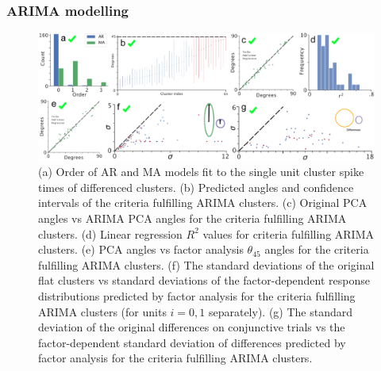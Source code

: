 \documentclass{article}
\begin{document}







\subsubsection*{ARIMA modelling}


\begin{figure}[t!]
\centering
\includegraphics[width=\textwidth]{Figure7.pdf}
\caption{(a) Order of AR and MA models fit to the single unit cluster spike times of differenced clusters. (b) Predicted angles and confidence intervals of the criteria fulfilling ARIMA clusters. (c) Original PCA angles vs ARIMA PCA angles for the criteria fulfilling ARIMA clusters. (d) Linear regression $R^2$ values for criteria fulfilling ARIMA clusters. (e) PCA angles vs factor analysis $\theta_{45}$ angles for the criteria fulfilling ARIMA clusters. (f) The standard deviations of the original flat clusters vs standard deviations of the factor-dependent response distributions predicted by factor analysis for the criteria fulfilling ARIMA clusters (for units $i = 0,1$ separately). (g) The standard deviation of the original differences on conjunctive trials vs the factor-dependent standard deviation of differences predicted by factor analysis for the criteria fulfilling ARIMA clusters.}
\label{fig:universe}
\end{figure}
\end{document}
